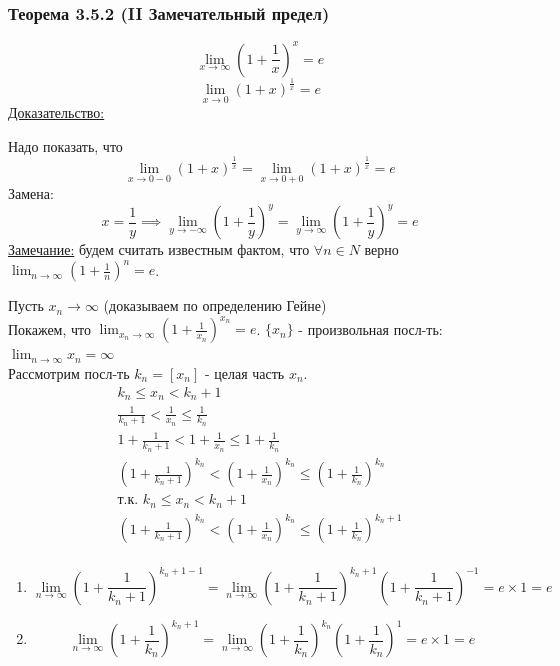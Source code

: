 \documentclass[12pt]{article}
\def\posl#1#2{\{#1_{#2}\}}
\begin{document}
    \subsubsection*{Теорема 3.5.2 (II Замечательный предел)}\label{th:3.5.2}
    \[ \lim_{x\to\infty}(1 + \frac{1}{x})^x = e \]
    \[ \lim_{x\to 0}(1 + x)^{\frac{1}{x}} = e \]\noindent
    \underline{Доказательство:}
    \begin{adjustwidth}{1.5em}{1.5em}
        Надо показать, что \[\lim_{x\to 0-0} (1 + x)^{\frac{1}{x}} = \lim_{x\to 0+0}(1+x)^{\frac{1}{x}} = e\]
        Замена: \[x = \frac{1}{y} \implies \lim_{y\to -\infty}\left(1 + \frac{1}{y}\right)^y = \lim_{y\to\infty}\left(1 + \frac{1}{y}\right)^y = e\]
        \underline{Замечание:} будем считать известным фактом, что $\forall n \in N$ верно $\lim_{n\to\infty}(1+\frac{1}{n})^n = e$.\par\noindent
        Пусть $x_n \to \infty$ (доказываем по определению Гейне)\\
        Покажем, что $\lim_{x_n\to\infty}(1 + \frac{1}{x_n})^{x_n} = e$. $\posl{x}{n}$ - произвольная посл-ть: $\lim_{n\to\infty}x_n = \infty$\\
        Рассмотрим посл-ть $k_n = [x_n]$ - целая часть $x_n$.\\
        \begin{gather*}
            k_n \le x_n < k_n + 1\\
            \frac{1}{k_n + 1} < \frac{1}{x_n} \le \frac{1}{k_n}\\
            1 + \frac{1}{k_n + 1} < 1 + \frac{1}{x_n} \le 1 + \frac{1}{k_n}\\
            \left(1 + \frac{1}{k_n + 1}\right)^{k_n} < \left(1 + \frac{1}{x_n}\right)^{k_n} \le \left(1 + \frac{1}{k_n}\right)^{k_n}\\
            \text{т.к. } k_n \le x_n < k_n + 1\\
            \left(1 + \frac{1}{k_n + 1}\right)^{k_n} < \left(1 + \frac{1}{x_n}\right)^{k_n} \le \left(1 + \frac{1}{k_n}\right)^{k_n+1}\\
        \end{gather*}
        \begin{enumerate}
            \item \[\lim_{n\to\infty}\left(1+\frac{1}{k_n+1}\right)^{k_n+1-1} = \lim_{n\to\infty}\left(1+\frac{1}{k_n+1}\right)^{k_n+1}\left(1+\frac{1}{k_n+1}\right)^{-1} = e \times 1 = e\]
            \item \[\lim_{n\to\infty}\left(1+\frac{1}{k_n}\right)^{k_n+1} = \lim_{n\to\infty}\left(1+\frac{1}{k_n}\right)^{k_n}\left(1+\frac{1}{k_n}\right)^{1} = e \times 1 = e\]

\end{enumerate}
\end{adjustwidth}
\end{document}
